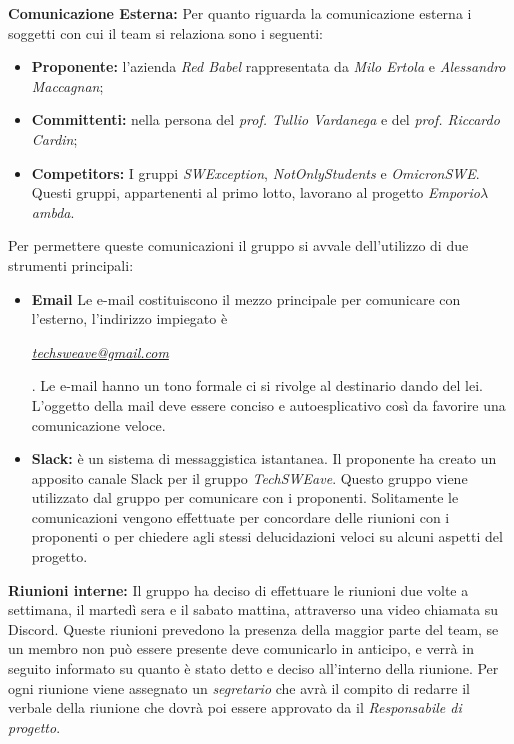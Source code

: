 \textbf{Comunicazione Esterna:}
Per quanto riguarda la comunicazione esterna i soggetti con cui il team si relaziona sono i seguenti:
\begin{itemize}
    \item \textbf{Proponente:} l'azienda \textit{Red Babel} rappresentata da \textit{Milo Ertola} e \textit{Alessandro Maccagnan};
    \item \textbf{Committenti:} nella persona del \textit{prof. Tullio Vardanega} e del \textit{prof. Riccardo Cardin};
    \item \textbf{Competitors:} I gruppi \textit{SWException}, \textit{NotOnlyStudents} e \textit{OmicronSWE}. Questi gruppi, appartenenti al primo lotto, lavorano al progetto \textit{Emporio\(\lambda\)ambda}.
\end{itemize}
Per permettere queste comunicazioni il gruppo si avvale dell'utilizzo di due strumenti principali:
\begin{itemize}
    \item \textbf{Email}
          Le e-mail costituiscono il mezzo principale per comunicare con l'esterno, l'indirizzo impiegato è
          \begin{center}
              \textit{\href{mailto:techsweave@gmail.com}{techsweave@gmail.com}}\end{center}. Le e-mail hanno un tono formale ci si rivolge al destinario dando del lei. L'oggetto della mail deve essere conciso e autoesplicativo così da favorire una comunicazione veloce.
    \item \textbf{Slack:}
          è un sistema di messaggistica istantanea. Il proponente ha creato un apposito canale Slack per il gruppo \textit{TechSWEave}. Questo gruppo viene utilizzato dal gruppo per comunicare con i proponenti. Solitamente le comunicazioni vengono effettuate per concordare delle riunioni con i proponenti o per chiedere agli stessi delucidazioni veloci su alcuni aspetti del progetto.
\end{itemize}
\textbf{Riunioni interne:}
Il gruppo ha deciso di effettuare le riunioni due volte a settimana, il martedì sera e il sabato mattina, attraverso una video chiamata su Discord. Queste riunioni prevedono la presenza della maggior parte del team, se un membro non può essere presente deve comunicarlo in anticipo, e verrà in seguito informato su quanto è stato detto e deciso all'interno della riunione. Per ogni riunione viene assegnato un \textit{segretario} che avrà il compito di redarre il verbale della riunione che dovrà poi essere approvato da il \textit{Responsabile di progetto}.
